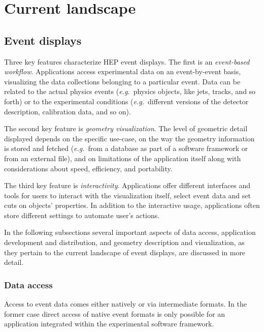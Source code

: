 \documentclass[12pt,a4paper]{article}
\begin{document}
\hypertarget{current-landscape}{%
\section{Current landscape}\label{current-landscape}}

\hypertarget{event-displays}{%
\subsection{Event displays}\label{event-displays}}

Three key features characterize HEP event displays. The first is an \emph{event-based workflow}. Applications access
experimental data on an event-by-event basis,
visualizing the data collections belonging to a particular event. Data can be related to the
actual physics events ({\it e.g.}\ physics objects, like jets, tracks, and so forth) or to the experimental
conditions ({\it e.g.}\ different versions of the detector description, calibration data, and so on).

The second key feature is \emph{geometry visualization}.
The level of geometric detail displayed depends on the specific use-case, on the way the geometry information is stored and fetched ({\it e.g.}\ from a database as part of a software framework or from an external file), and on limitations of the application itself along with
considerations about speed, efficiency, and portability.

The third key feature is \emph{interactivity}. Applications offer different interfaces and tools for users to interact
with the visualization itself, select event data and set cuts on objects' properties.
In addition to the interactive usage, applications often store different settings to automate user’s actions.

In the following subsections several important aspects of data access, application development and distribution, and geometry description
and visualization, as they pertain to the current landscape of event displays, are discussed in more detail.



\hypertarget{data-access}{%
\subsubsection{Data access}\label{data-access}}

Access to event data comes either natively or via intermediate formats. In the former case direct access of native event formats
is only possible for an application integrated within the experimental software framework.
\end{document}
